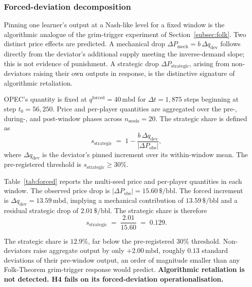 \subsubsection{Forced-deviation decomposition}
\label{subsec:forced}

Pinning one learner's output at a Nash-like level for a fixed
window is the algorithmic analogue of the grim-trigger experiment
of Section~\ref{subsec:folk}. Two distinct price effects are predicted. A
mechanical drop $\Delta P_{\text{mech}} = b\,\Delta
q_{\text{dev}}$ follows directly from the deviator's additional
supply meeting the inverse-demand slope; this is not evidence of
punishment. A strategic drop $\Delta P_{\text{strategic}}$,
arising from non-deviators raising their own outputs in response,
is the distinctive signature of algorithmic retaliation.

OPEC's quantity is fixed at $q^{\text{forced}} = 40\,\text{mbd}$
for $\Delta t = 1{,}875$ steps beginning at step $t_0 = 56{,}250$.
Price and per-player quantities are aggregated over the pre-,
during-, and post-window phases across $n_{\text{seeds}} = 20$.
The strategic share is defined as
\begin{equation}
  \label{eq:strategic}
  s_{\text{strategic}}
    \;=\; 1 - \frac{b\,\Delta q_{\text{dev}}}
                   {|\Delta P_{\text{obs}}|},
\end{equation}
where $\Delta q_{\text{dev}}$ is the deviator's pinned increment
over its within-window mean. The pre-registered threshold is
$s_{\text{strategic}} \geq 30\%$.

Table~\ref{tab:forced} reports the multi-seed price and
per-player quantities in each window. The observed price drop is
$|\Delta P_{\text{obs}}| = 15.60\,\$\text{/bbl}$. The forced
increment is $\Delta q_{\text{dev}} = 13.59\,\text{mbd}$,
implying a mechanical contribution of $13.59\,\$\text{/bbl}$ and
a residual strategic drop of $2.01\,\$\text{/bbl}$. The
strategic share is therefore
\begin{equation*}
  s_{\text{strategic}}
    \;=\; \frac{2.01}{15.60} \;=\; 0.129.
\end{equation*}

\begin{verdict*}
The strategic share is $\mathbf{12.9\%}$, far below the pre-registered
$30\%$ threshold. Non-deviators raise aggregate output by only
$+2.00\,\text{mbd}$, roughly $0.13$ standard deviations of
their pre-window output, an order of magnitude smaller than any
Folk-Theorem grim-trigger response would predict.
\textbf{Algorithmic retaliation is not detected. H4 fails on its
forced-deviation operationalisation.}
\end{verdict*}

